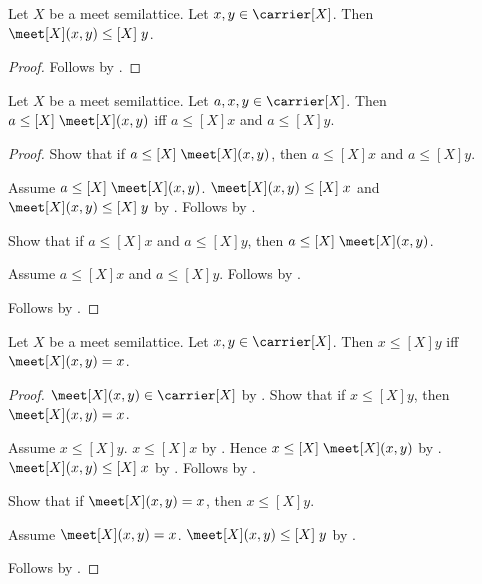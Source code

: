 \begin{proposition}\label{meet_lower_right}
    Let $X$ be a meet semilattice.
    Let $x,y\in\carrier[X]$.
    Then $\meet[X](x,y)\mathrel{\leq[X]}y$.
\end{proposition}
\begin{proof}
    Follows by .
\end{proof}

\begin{proposition}\label{leq_meet_iff}
    Let $X$ be a meet semilattice.
    Let $a,x,y\in\carrier[X]$.
    Then $a\mathrel{\leq[X]}\meet[X](x,y)$ iff
        $a\mathrel{\leq[X]}x$ and $a\mathrel{\leq[X]}y$.
\end{proposition}
\begin{proof}
    Show that if $a\mathrel{\leq[X]}\meet[X](x,y)$, then
        $a\mathrel{\leq[X]}x$ and $a\mathrel{\leq[X]}y$.
    \begin{subproof}
        Assume $a\mathrel{\leq[X]}\meet[X](x,y)$.
        $\meet[X](x,y)\mathrel{\leq[X]}x$ and
            $\meet[X](x,y)\mathrel{\leq[X]}y$ by .
        Follows by
            .
    \end{subproof}
    Show that if $a\mathrel{\leq[X]}x$ and $a\mathrel{\leq[X]}y$,
        then $a\mathrel{\leq[X]}\meet[X](x,y)$.
    \begin{subproof}
        Assume $a\mathrel{\leq[X]}x$ and $a\mathrel{\leq[X]}y$.
        Follows by .
    \end{subproof}
    Follows by \auto.
\end{proof}

\begin{proposition}\label{leq_iff_meet_eq_left}
    Let $X$ be a meet semilattice.
    Let $x,y\in\carrier[X]$.
    Then $x\mathrel{\leq[X]}y$ iff $\meet[X](x,y)=x$.
\end{proposition}
\begin{proof}
    $\meet[X](x,y)\in\carrier[X]$ by .
    Show that if $x\mathrel{\leq[X]}y$, then $\meet[X](x,y)=x$.
    \begin{subproof}
        Assume $x\mathrel{\leq[X]}y$.
        $x\mathrel{\leq[X]}x$ by
            .
        Hence $x\mathrel{\leq[X]}\meet[X](x,y)$ by .
        $\meet[X](x,y)\mathrel{\leq[X]}x$ by .
        Follows by
            .
    \end{subproof}
    Show that if $\meet[X](x,y)=x$, then $x\mathrel{\leq[X]}y$.
    \begin{subproof}
        Assume $\meet[X](x,y)=x$.
        $\meet[X](x,y)\mathrel{\leq[X]}y$ by .
    \end{subproof}
    Follows by \auto.
\end{proof}

